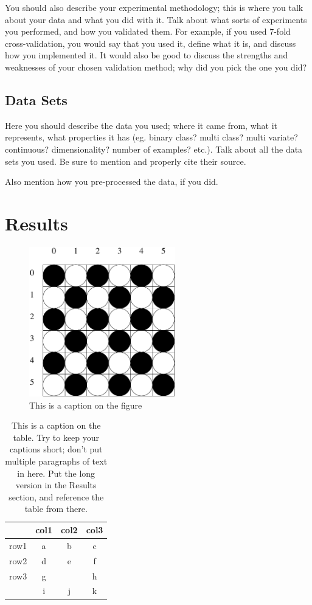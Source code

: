 \documentclass[12pt, letterpaper]{article}
\begin{document}
You should also describe your experimental methodology; this is where you talk
about your data and what you did with it.  Talk about what sorts of experiments
you performed, and how you validated them.  For example, if you used 7-fold
cross-validation, you would say that you used it, define what it is, and discuss
how you implemented it.  It would also be good to discuss the strengths and
weaknesses of your chosen validation method; why did you pick the one you did?

\subsection*{Data Sets}
Here you should describe the data you used; where it came from, what it
represents, what properties it has (eg. binary class? multi class? multi
variate? continuous? dimensionality? number of examples? etc.).  Talk about all
the data sets you used.  Be sure to mention and properly cite their source.

Also mention how you pre-processed the data, if you did.


\section{Results}
\begin{figure}
\begin{center}
\includegraphics[width=2.5in]{images/konane1.pdf}
\end{center}
\caption{This is a caption on the figure}
\label{somefigure}
\end{figure}

\begin{table}
\begin{center}
\begin{tabular}{|c||c|cc}
\hline
& col1 & col2 & col3\\
\hline \hline
row1 & a & b & c\\
\hline 
row2 & d & e & f\\
\hline 
row3 & g &   & h\\
 & i & j & k\\
\hline 
\end{tabular}
\end{center}
\caption{This is a caption on the table.  Try to keep your captions short; don't
put multiple paragraphs of text in here.  Put the long version in the Results
section, and reference the table from there.}
\label{sometable}
\end{table}
\end{document}
